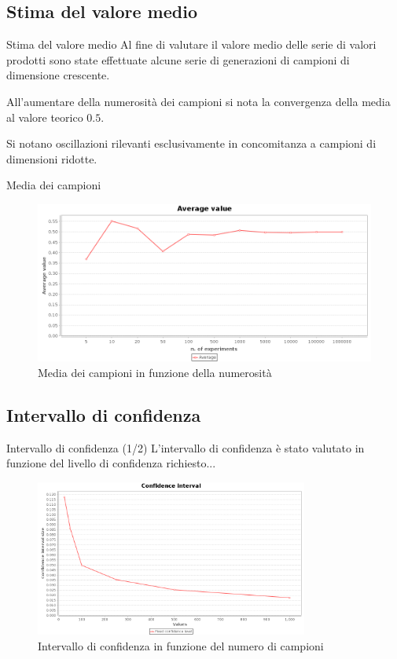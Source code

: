 \documentclass[slidestop,compress,mathserif]{beamer}
\begin{document}
\subsection{Stima del valore medio}
\begin{frame}{Stima del valore medio}
\vfill
Al fine di valutare il valore medio delle serie di valori prodotti sono state effettuate alcune serie di generazioni di campioni di dimensione crescente.

All'aumentare della numerosit\`a dei campioni si nota la convergenza della media al valore teorico $0.5$.

Si notano oscillazioni rilevanti esclusivamente in concomitanza a campioni di dimensioni ridotte.
\vfill
\end{frame}

\begin{frame}{Media dei campioni}
\begin{figure}[!h]{
	\begin{center}
	   \includegraphics[width=0.95	\textwidth]{figures/average.png}
	\end{center}}
	\caption{Media dei campioni in funzione della numerosit\`a}
	\label{fig:avg}
\end{figure}
\end{frame}

\subsection{Intervallo di confidenza}
\begin{frame}{Intervallo di confidenza (1/2)}
L'intervallo di confidenza \`e stato valutato in funzione del livello di confidenza richiesto...
\begin{figure}[!h]{
	\begin{center}
	   \includegraphics[width=0.8\textwidth]{figures/IDC_1.png}
	\end{center}}
	\caption{Intervallo di confidenza in funzione del numero di campioni}
	\label{fig:idce1}
\end{figure}
\end{frame}
\end{document}
